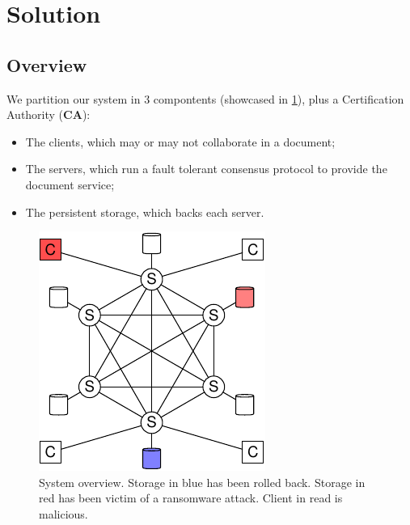 \section{Solution}

\subsection{Overview}

We partition our system in 3 compontents (showcased in
\ref{fig:overview}), plus a Certification Authority (\textbf{CA}):
\begin{itemize}
    \setlength{\itemsep}{0pt}
    \setlength{\parskip}{0pt}
    \setlength{\parsep}{0pt}
    \item The clients, which may or may not collaborate in a
        document;
    \item The servers, which run a fault tolerant consensus
        protocol to provide the document service;
    \item The persistent storage, which backs each server.
\end{itemize}

\begin{figure}[ht]
    \centering
    \includegraphics[width=.5\linewidth]{img/sys-1}
    \caption{System overview. Storage in blue has been rolled
    back. Storage in red has been victim of a ransomware attack.
    Client in read is malicious.}
    \label{fig:overview}
\end{figure}

